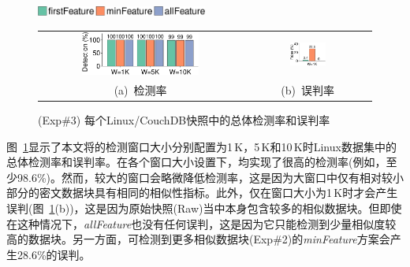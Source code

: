 \begin{figure}[!htb]
    \centering
    \includegraphics[width=0.5\textwidth]{pic/featurespy/plot/detection/overall/effectiveness-falsePositive_legend.pdf}
    \vspace{5pt}\\
    \begin{tabular}{@{\ }c@{\ }c}
        \includegraphics[width=0.6\textwidth]{pic/featurespy/plot/detection/overall/effectivenessLinux.pdf} &
        \includegraphics[width=0.3\textwidth]{pic/featurespy/plot/detection/overall/falsePositiveLinux.pdf}   \\
        \mbox{\small (a) 检测率}                                                                            &
        \mbox{\small (b) 误判率}                                                                              \\
    \end{tabular}
    \caption{(Exp\#3) 每个Linux/CouchDB快照中的总体检测率和误判率}
    \label{fig:featurespy-expDetectionOverallFalsePositive}
\end{figure}

图~\ref{fig:featurespy-expDetectionOverallFalsePositive}显示了本文将\sysnameF 的检测窗口大小分别配置为1\,K，5\,K和10\,K时Linux数据集中的总体检测率和误判率。在各个窗口大小设置下，\sysnameF 均实现了很高的检测率(例如，至少98.6\%)。然而，较大的窗口会略微降低检测率，这是因为大窗口中仅有相对较小部分的密文数据块具有相同的相似性指标。此外，\sysnameF 仅在窗口大小为1\,K时才会产生误判(图~\ref{fig:featurespy-expDetectionOverallFalsePositive}(b))，这是因为原始快照(Raw)当中本身包含较多的相似数据块。但即使在这种情况下，\textit{allFeature}也没有任何误判，这是因为它只能检测到少量相似度较高的数据块。另一方面，可检测到更多相似数据块(Exp\#2)的\textit{minFeature}方案会产生28.6\%的误判。

